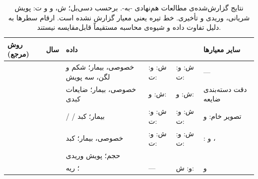 \begin{table}[H]
\centering
\scriptsize
\caption{نتایج گزارش‌شده‌ی مطالعات هم‌نهادی -به-.  برحسب دسی‌بل؛ ش، و و ت: پویش شریانی، وریدی و تأخیری. خط تیره یعنی معیار گزارش نشده است. ارقام سطرها به دلیل تفاوت داده و شیوه‌ی محاسبه مستقیماً قابل‌مقایسه نیستند.}
\label{tab:synthesis-results}
\begin{tabular}{|R{2.5cm}|R{0.7cm}|R{3.2cm}|R{1.7cm}|R{1.6cm}|R{3.6cm}|}
\hline
\textbf{روش (مرجع)} & \textbf{سال} & \textbf{داده} & \textbf{} & \textbf{} & \textbf{سایر معیارها} \\
\hline
{}~\cite{Liu22} &  & خصوصی،  بیمار؛ شکم و لگن، سه پویش & ش: \newline و: \newline ت:  & ش: \newline و: \newline ت:  & --- \\
\hline
{}~\cite{Yan24c} &  & خصوصی،  بیمار؛ ضایعات کبدی & ش: \newline و:  & ش: \newline و:  & دقت دسته‌بندی ضایعه  \\
\hline
{}~\cite{Zha25} &  &  /  /  بیمار؛ کبد & ش: \newline و: \newline ت:  & ش: \newline و: \newline ت:  & تصویر خام:  و  \\
\hline
{}~\cite{Che24} &  & خصوصی،  بیمار؛ کبد & ش: \newline و: \newline ت:  & ش: \newline و: \newline ت:  & :   و ،   \\
\hline
{}~\cite{Zhu25c} &  &  حجم؛ پویش وریدی &  &  &   \\
\hline
{}~\cite{Ris21} &  & ؛ ریه & --- & و: \newline ش:  &   و  \\

\end{tabular}
\end{table}
